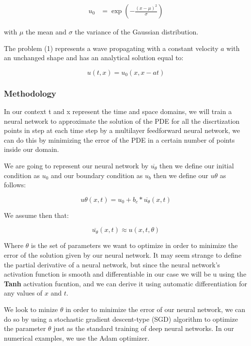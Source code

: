 \documentclass{article}
\begin{document}
\begin{align*}
    u_0 &= \exp\left(-\frac{(x - \mu)^2}{\sigma}\right)
\end{align*}

with $\mu$ the mean and $\sigma$ the variance of the Gaussian distribution.

The problem (1) represents a wave propagating with a constant velocity $a$ with an unchanged shape and has an analytical solution equal to: 

$$
u(t, x)=u_0(x, x-at)
$$



\subsubsection{Methodology}

In our context t and x represent the time and space domains, we will train a neural network to approximate the solution of the PDE for all the discrtization points in step 
at each time step  by a multilayer feedforward neural network, we can do this by minimizing the error of the PDE in a certain number of points inside our domain.

We are going to represent our neural network by $\overline{u_\theta}$ then we define our initial condition as $u_0$ and our boundary condition as $u_b$ then we define our $u\theta$ as follows:

$$
u\theta(x,t) = u_0 + b_c * \overline{u_\theta}(x,t)
$$

We assume then that:

$$\overline{u_\theta}(x,t)\approx u(x,t,\theta)$$ 

Where $\theta$ is the set of parameters we want to optimize in order to minimize the error of the solution given by our neural network.
It may seem strange to define the partial derivative of a neural network, but since the neural network's activation function is smooth and differentiable in our case we will be u
using the \textbf{Tanh} activation fucntion, and we can derive it using automatic differentiation for any values of $x$ and $t$.

We look to minize $\theta$ in order to minimize the error of our neural network, we can do so by using  a stochastic gradient descent-type (SGD) algorithm to optimize the parameter $\theta$ just 
as the standard training of deep neural networks. In our numerical examples, we use the Adam optimizer.
\end{document}

